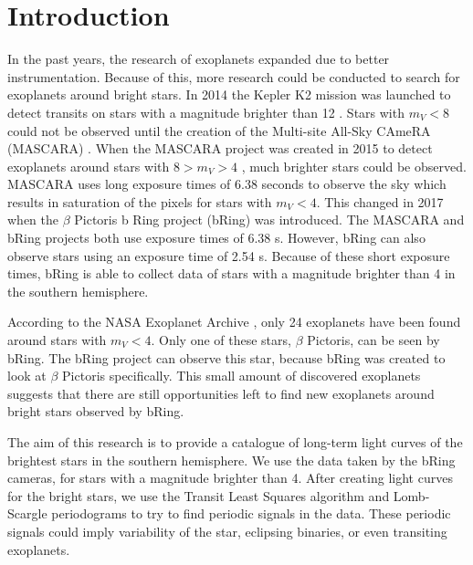 \documentclass{aa}
\begin{document}
\section{Introduction}

In the past years, the research of exoplanets expanded due to better instrumentation.
%
Because of this, more research could be conducted to search for exoplanets around bright stars.
%
In 2014 the Kepler K2 mission was launched to detect transits on stars with a magnitude brighter than 12 \citep{Howell_2014}.
%
Stars with $m_V<8$ could not be observed until the creation of the Multi-site All-Sky CAmeRA (MASCARA) \citep{mascara}.
%
When the MASCARA project was created in 2015 to detect exoplanets around stars with $8 > m_V > 4$ \citep{Talens_2017}, much brighter stars could be observed.
%
MASCARA uses long exposure times of 6.38 seconds to observe the sky which results in saturation of the pixels for stars with $m_V < 4$.
%
This changed in 2017 when the $\beta$ Pictoris b Ring project (bRing) \citep{bring} was introduced.
%
The MASCARA and bRing projects both use exposure times of 6.38 s.
%
However, bRing can also observe stars using an exposure time of 2.54 s.
%
Because of these short exposure times, bRing is able to collect data of stars with a magnitude brighter than 4 in the southern hemisphere.

According to the NASA Exoplanet Archive \citep{NASA_Exoplanet_Archive}, only 24 exoplanets have been found around stars with $m_V < 4$.
%
Only one of these stars, $\beta$ Pictoris, can be seen by bRing.
%
The bRing project can observe this star, because bRing was created to look at $\beta$ Pictoris specifically.
%
This small amount of discovered exoplanets suggests that there are still opportunities left to find new exoplanets around bright stars observed by bRing.

The aim of this research is to provide a catalogue of long-term light curves of the brightest stars in the southern hemisphere.
%
We use the data taken by the bRing cameras, for stars with a magnitude brighter than 4.
%
After creating light curves for the bright stars, we use the Transit Least Squares algorithm \citep{Hippke_2019} and Lomb-Scargle periodograms \citep{VanderPlas_2012,VanderPlas_2015} to try to find periodic signals in the data.
%
These periodic signals could imply variability of the star, eclipsing binaries, or even transiting exoplanets.

%
%
%
%
%
%
\end{document}
